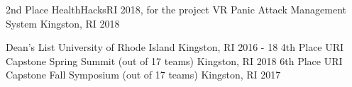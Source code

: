 \graduateheader
\begin{cvhonors}
  \cvhonor
    {2nd Place}
    {HealthHacksRI 2018, for the project VR Panic Attack Management System}
    {Kingston, RI}
    {2018}
\end{cvhonors}

\ugradheader
\begin{cvhonors}
  \cvhonor
    {Dean's List}
    {University of Rhode Island}
    {Kingston, RI}
    {2016 - 18}
  \cvhonor
    {4th Place}
    {URI Capstone Spring Summit (out of 17 teams)}
    {Kingston, RI}
    {2018}
  \cvhonor
    {6th Place}
    {URI Capstone Fall Symposium (out of 17 teams)}
    {Kingston, RI}
    {2017}
\end{cvhonors}
